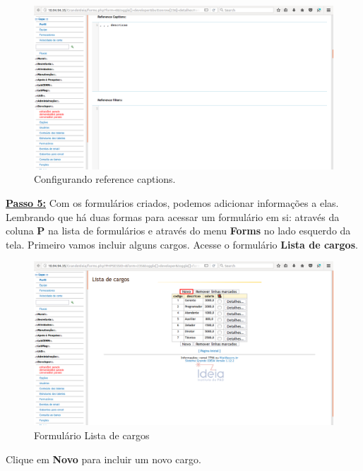 \documentclass[9pt]{report}
\begin{document}
{      \begin{figure}[H]
        \includegraphics[width=\textwidth]{2_Formularios/3_Relacionamento_1_N/29.png}
        \caption{Configurando reference captions.}
        \label{fig:referencecaptions}
      \end{figure}
      
      \underline{\textbf{Passo 5:}} Com os formulários criados,
      podemos adicionar informações a elas. Lembrando que há duas
      formas para acessar um formulário em si: através da coluna
      \textbf{P} na lista de formulários e através do menu
      \textbf{Forms} no lado esquerdo da tela. Primeiro vamos incluir
      alguns cargos. Acesse o formulário \textbf{Lista de cargos}.

       \begin{figure}[H]
        \includegraphics[width=\textwidth]{2_Formularios/3_Relacionamento_1_N/30.png}
        \caption{Formulário Lista de cargos}
        \label{fig:listacargos}
       \end{figure}

       Clique em \textbf{Novo} para incluir um novo cargo.
       
}
\end{document}
